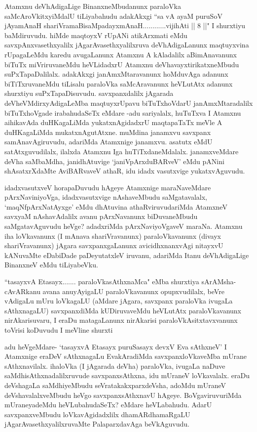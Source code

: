 \begin{artha}
Atamxnu deVhAdigaLige BinanxneMbudanunx paraloVka saMcAroVkitxyiMdalU tiLiyabahudu adakAkxgi ``sa vA ayaM puruSoV jAyamAnaH shariVramaBisaMpadayxmAnaH............vijihAti || 8 ||" I shurxtiyu baMdiruvudu. hiMde maqtoyxV rUpANi atikArxmati eMdu savxpAnxvasethxyalilx jAgarAvasethxyalilxruva deVhAdigaLanunx maqtuyxvina rUpagaLeMdu karedu avugaLanunx Atamxnu A kAladalilx aBimAnavanunx biTuTx miVriruvaneMdu heVLidadxrU Atamxnu deVhavayxtirikatxneMbudu suPxTapaDalilalx. adakAkxgi janAmxMtaravanunx hoMduvAga adanunx biTiTxruvaneMdu tiLisalu paraloVka saMcAravanunx heVLutAtx adanunx shurxtiyu suPxTapaDisuvudu. savxpanxdalilx jAgarada deVheVMdirxyAdigaLeMba maqtuyxrUpavu biTuTxhoVdarU janAmxMtaradalilx biTuTxhoVgade irabahudaSeTx eMdare -adu sariyalalx, huTuTxva I Atamxnu aihikavAda duHKagaLiMda yukatxnAgidadxrU maqtapaTaTx meVle A duHKagaLiMda mukatxnAgutAtxne. muMdina janamxvu savxpanx samAnavAgiruvudu, adariMda Atamxnige janamxvu. asatutx eMdU satAtxguvudilalx, ilalxda Atamxnu Iga huTiTxdaneMdalalx. janamxveMdare deVha saMbaMdha, janidhAtuvige `janiVpArxduBARveV' eMdu pANini shAsatxrXdaMte AviBARvaveV athaR, idu idadx vasutxvige yukatxvAguvudu. 
\end{artha}%

\begin{artha}
idadxvasutxveV horapaDuvudu hAgeye Atamxnige maraNaveMdare pArxNaviniyoVga, idadxvasutxvige nAshaveMbudu saMgatavalalx, `maqNfpArxNatAyxge' eMdu dhAtuvina athaRviruvudariMda AtamxneV savxyaM nAshavAdalilx avanu pArxNavanunx biDuvaneMbudu saMgatavAguvudu heVge? adadxriMda pArxNaviyoVgaveV maraNa. Atamxnu iha loVkavanunx (I mAnava shariVravanunx) paraloVkavanunx (divayx shariVravanunx) jAgara savxpanxgaLanunx avicidhxnanxvAgi nitayxvU kANuvaMte eDabiDade paDeyutatxleV iruvanu, adariMda Itanu deVhAdigaLige BinanxneV eMdu tiLiyabeVku. 
\end{artha}


\begin{artha}
``tasayxvA Etasayx....... paraloVkasAthxnaMca" eMba shurxtiya sArAMsha- cAvARkanu avana anuyAyigaLU paraloVkavanunx opupxvudilalx, beVre vAdigaLu mUru loVkagaLU (aMdare jAgara, savxpanx paraloVka ivugaLa sAthxnagaLU) savxpanxdiMda kUDiruvaveMdu heVLutAtx paraloVkavanunx nirAkarisuvaru, I eraDu matagaLanunx nirAkarisi paraloVkAsitxtavxvanunx toVrisi koDuvudu I meVline shurxti
\end{artha}

\begin{artha}
adu heVgeMdare- `tasayxvA Etasayx puruSasayx devxV Eva sAthxneV' I Atamxnige eraDeV sAthxnagaLu EvakAradiMda savxpanxloVkaveMba mUrane sAthxnavilalx. ihaloVka (I jAgarada deVha) paraloVka, ivugaLa naDuve saMdhisAthxnadalilxruvude savxpanxsAthxna, idu mUraneV loVkavalalx. eraDu deVshagaLa saMdhiyeMbudu seVratakakxparxdeVsha, adoMdu mUraneV deVshavalalxveMbudu heVgo savxpanxsAthxnavU hAgeye. BoVgaviruvuriMda mUraneyadeMdu heVLubahudaSeTx? eMdare heVLabahudu. AdarU savxpanxveMbudu loVkavAgidadxlilx dhamARdhamaRgaLU jAgarAvasethxyalilxruvaMte PalaparxdavAga beVkAguvudu. 
\end{artha}

